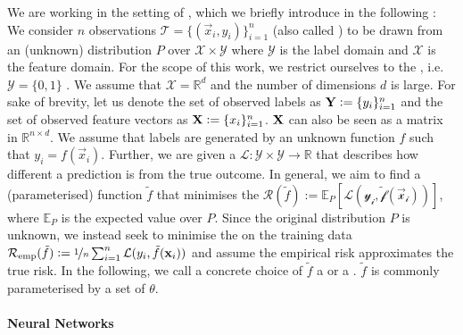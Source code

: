 \documentclass[
	fontsize=10pt, %
	twoside=false, %
	secnumdepth=1, %
]{kaobook}
\begin{document}
We are working in the setting of , which we
briefly introduce in the following
\cite{vapnik_PrinciplesRiskMinimization_,bronstein_geometric_2021}
: We consider $n$ observations $\mathcal{T} = \{(\vec x_i, y_i)\}_{i=1}^n$ (also
called ) to be drawn from an (unknown) distribution $P$ over
$\mathcal{X} \times \mathcal{Y}$ where $\mathcal{Y}$ is the label domain and
$\mathcal{X}$ is the feature domain. For the scope of this work, we restrict
ourselves to the , i.e. $\mathcal{Y} =
\{0,1\}$ . We assume that $\mathcal{X} = \mathbb{R}^d$ and the number of
dimensions $d$ is large. For sake of brevity, let us denote the set of observed
 labels as $\mat Y := \{y_i\}_{i=1}^n$ and the set of observed
feature vectors as $\mat X := \{x_i\}_{i=1}^n$. $\mat X$ can also be seen as a
matrix in $\mathbb{R}^{n \times d}$.
%
We assume that labels are generated by an unknown function $f$ such that $y_i
= f(\vec x_i)$.
%
Further, we are given a  $\mathcal{L} :
\mathcal{Y} \times \mathcal{Y} \rightarrow \mathbb{R}$ that describes how
different a prediction is from the true outcome.
%
In general, we aim to find a (parameterised) function $\tilde f$ that minimises
the  $\mathcal{R}(\tilde f) := \mathbb{E}_P\left[ \mathcal{L(y_i,
    \tilde f(\vec x_i))} \right]$, where $\mathbb{E}_P$ is the expected value
over $P$.
%
Since the original distribution $P$ is unknown, we instead seek to minimise the 
  on the training data
$\mathcal{R}_{\text{emp}}(\tilde f) := \nicefrac{1}{n}
\sum_{i=1}^n \mathcal{L}(y_i, \tilde f(\vec x_i))$ and assume the empirical risk
approximates the true risk.
%
In the following, we call a concrete choice of $\tilde f$ a  or a
. $\tilde f$ is commonly parameterised by a set of 
$\theta$.


\paragraph{Neural Networks}
\end{document}
